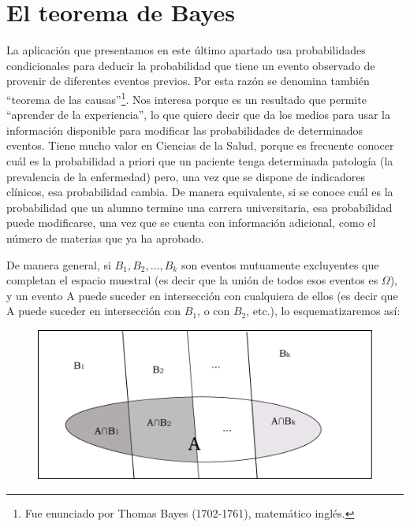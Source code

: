 \documentclass[]{book}
\let\rmarkdownfootnote\footnote%
\def\footnote{\protect\rmarkdownfootnote}
\begin{document}
\hypertarget{el-teorema-de-bayes}{%
\section{El teorema de Bayes}\label{el-teorema-de-bayes}}

La aplicación que presentamos en este último apartado usa probabilidades
condicionales para deducir la probabilidad que tiene un evento observado
de provenir de diferentes eventos previos. Por esta razón se denomina
también ``teorema de las causas''\footnote{Fue enunciado por Thomas Bayes (1702-1761), matemático inglés.}. Nos interesa porque es un
resultado que permite ``aprender de la experiencia'', lo que quiere decir
que da los medios para usar la información disponible para modificar las
probabilidades de determinados eventos. Tiene mucho valor en Ciencias de
la Salud, porque es frecuente conocer cuál es la probabilidad a priori
que un paciente tenga determinada patología (la prevalencia de la
enfermedad) pero, una vez que se dispone de indicadores clínicos, esa
probabilidad cambia. De manera equivalente, si se conoce cuál es la
probabilidad que un alumno termine una carrera universitaria, esa
probabilidad puede modificarse, una vez que se cuenta con información
adicional, como el número de materias que ya ha aprobado.

De manera general, si \(B_{1}, B_{2}, \ldots, B_{k}\) son eventos mutuamente excluyentes que completan el espacio muestral (es decir que la unión de todos esos eventos es \(\Omega\)), y un evento A puede suceder en intersección con cualquiera de ellos (es decir que A puede suceder en intersección con \(B_{1}\), o con \(B_{2}\), etc.), lo esquematizaremos así:

\begin{figure}

{\centering \includegraphics[width=13.14in]{imagenes/image93} 

}

\end{figure}
\end{document}
